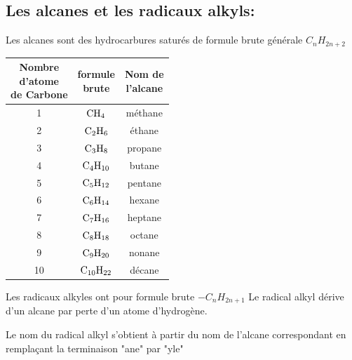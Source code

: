 \documentclass[12pt]{article}
\begin{document}
\subsection{Les alcanes et les radicaux alkyls: }
Les alcanes sont des hydrocarbures saturés de formule brute générale $C_nH_{2n+2}$

 \begin{center}
    \begin{tabular}{ |c|c|c| } 
\hline
      \makecell{Nombre \\d'atome \\de Carbone} & \makecell{formule\\ brute} & \makecell{Nom de\\ l'alcane}\\\hline
      1 &$\ce{CH_4}$    & méthane\\\hline
      
      2 &$\ce{C_2H_6}$  & éthane\\\hline
      
      3 &$\ce{C_3H_8}$    &propane  \\\hline
      4 &$\ce{C_4H_{10}}$ &butane \\\hline
      
      5 &$\ce{C_5H_{12}}$ &pentane \\\hline
      
      6 &$\ce{C_6H_{14}}$ &hexane\\\hline
      7 &$\ce{C_7H_{16}}$ &heptane\\\hline
      8 &$\ce{C_8H_{18}}$ &octane\\\hline
      9 &$\ce{C_9H_{20}}$ &nonane\\\hline
      10 &$\ce{C_10H_{22}}$ &décane\\\hline
      \hline
\end{tabular}
  \end{center}
 
  \begin{tcolorbox}
  Les radicaux alkyles ont pour formule brute $-C_n H_{2n+1}$
Le radical alkyl dérive d'un alcane par perte d'un atome d'hydrogène.

Le nom du radical alkyl s'obtient à partir du nom de l'alcane correspondant en remplaçant la terminaison "ane" par
"yle"
\end{tcolorbox}
\end{document}
